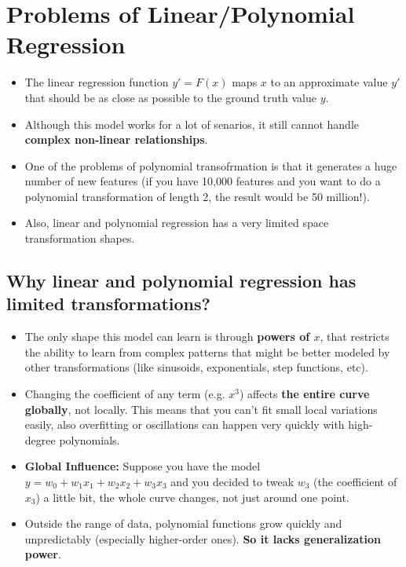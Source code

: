 \documentclass[20pt]{article}
\begin{document}
\section{Problems of Linear/Polynomial Regression}

\begin{itemize}
    \item The linear regression function $y' = F(x)$ maps $x$ to an approximate value $y'$ that should be as close as possible to the ground truth value $y$.
    \item Although this model works for a lot of senarios, it still cannot handle \textbf{complex non-linear relationships}.
    \item One of the problems of polynomial transofrmation is that it generates a huge number of new features (if you have 10,000 features and you want to do a polynomial transformation of length 2, the result would be 50 million!).
    \item Also, linear and polynomial regression has a very limited space transformation shapes.
\end{itemize}

\subsection{Why linear and polynomial regression has limited transformations?}
\begin{itemize}
    \item The only shape this model can learn is through \textbf{powers of $x$}, that restricts the ability to learn from complex patterns that might be better modeled by other transformations (like sinusoids, exponentials, step functions, etc).
    \item Changing the coefficient of any term (e.g. $x^3$) affects \textbf{the entire curve globally}, not locally. This means that you can't fit small local variations easily, also overfitting or oscillations can happen very quickly with high-degree polynomials.
    \item \textbf{Global Influence:} Suppose you have the model $y = w_0 + w_1 x_1 + w_2 x_2 + w_3 x_3$ and you decided to tweak $w_3$ (the coefficient of $x_3$) a little bit, the whole curve changes, not just around one point.
    \item Outside the range of data, polynomial functions grow quickly and unpredictably (especially higher-order ones). \textbf{So it lacks generalization power}.
\end{itemize}
\end{document}
